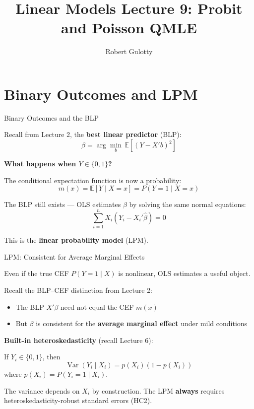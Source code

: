 \documentclass[aspectratio=169, handout, t]{beamer}
\title[PLSC 30700]{Linear Models Lecture 9: Probit and Poisson QMLE}
\author{Robert Gulotty}
\institute[Chicago]{University of Chicago}
\numberwithin{equation}{section}
\begin{document}
\begin{frame}
\maketitle
\end{frame}

\section{Binary Outcomes and LPM}

\begin{frame}{Binary Outcomes and the BLP}

Recall from Lecture 2, the \textbf{best linear predictor} (BLP):
\[
\beta = \arg\min_b \, \mathbb{E}\left[(Y - X'b)^2\right]
\]

\pause

\textbf{What happens when $Y \in \{0,1\}$?}

\pause

The conditional expectation function is now a probability:
\[
m(x) = \mathbb{E}[Y \mid X = x] = P(Y = 1 \mid X = x)
\]

\pause

The BLP still exists --- OLS estimates $\beta$ by solving the same normal equations:
\[
\sum_{i=1}^n X_i(Y_i - X_i'\hat\beta) = 0
\]

This is the \textbf{linear probability model} (LPM).

\end{frame}


\begin{frame}{LPM: Consistent for Average Marginal Effects}

Even if the true CEF $P(Y=1 \mid X)$ is nonlinear, OLS estimates a useful object.

\pause

Recall the BLP--CEF distinction from Lecture 2:
\begin{itemize}
    \item The BLP $X'\beta$ need not equal the CEF $m(x)$
    \item But $\beta$ is consistent for the \textbf{average marginal effect} under mild conditions
\end{itemize}

\pause

\textbf{Built-in heteroskedasticity} (recall Lecture 6):

If $Y_i \in \{0,1\}$, then
\[
\operatorname{Var}(Y_i \mid X_i) = p(X_i)(1 - p(X_i))
\]
where $p(X_i) = P(Y_i = 1 \mid X_i)$.

\pause

The variance depends on $X_i$ by construction. The LPM \textbf{always} requires heteroskedasticity-robust standard errors (HC2).

\end{frame}
\end{document}
